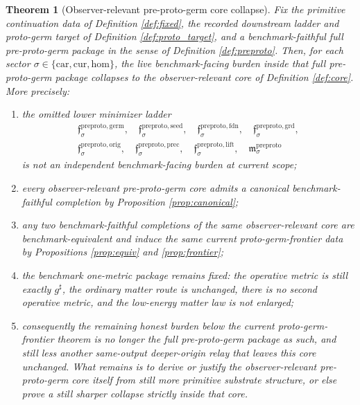 \documentclass[11pt]{article}
\newcommand{\CompletedMetric}{g^{\sharp}}
\newcommand{\Car}{\mathrm{car}}
\newcommand{\Cur}{\mathrm{cur}}
\newcommand{\Hom}{\mathrm{hom}}
\newcommand{\PreProtoGermMin}[1]{\mathfrak f_{#1}^{\mathrm{preproto,germ}}}
\newcommand{\PreProtoSeedMin}[1]{\mathfrak f_{#1}^{\mathrm{preproto,seed}}}
\newcommand{\PreProtoFoundMin}[1]{\mathfrak f_{#1}^{\mathrm{preproto,fdn}}}
\newcommand{\PreProtoGroundMin}[1]{\mathfrak f_{#1}^{\mathrm{preproto,grd}}}
\newcommand{\PreProtoOrigMin}[1]{\mathfrak f_{#1}^{\mathrm{preproto,orig}}}
\newcommand{\PreProtoPrecMin}[1]{\mathfrak f_{#1}^{\mathrm{preproto,prec}}}
\newcommand{\PreProtoLiftMin}[1]{\mathfrak f_{#1}^{\mathrm{preproto,lift}}}
\newcommand{\PreProtoSubMin}[1]{\mathfrak m_{#1}^{\mathrm{preproto}}}
\newtheorem{theorem}{Theorem}
\begin{document}
\begin{theorem}[Observer-relevant pre-proto-germ core collapse]
\label{thm:main}
Fix the primitive continuation data of Definition \ref{def:fixed}, the recorded downstream ladder and proto-germ target of Definition \ref{def:proto_target}, and a benchmark-faithful full pre-proto-germ package in the sense of Definition \ref{def:preproto}. Then, for each sector \(\sigma\in\{\Car,\Cur,\Hom\}\), the live benchmark-facing burden inside that full pre-proto-germ package collapses to the observer-relevant core of Definition \ref{def:core}. More precisely:
\begin{enumerate}
    \item the omitted lower minimizer ladder
    \[
    \begin{aligned}
    \PreProtoGermMin{\sigma},\quad
    \PreProtoSeedMin{\sigma},\quad
    \PreProtoFoundMin{\sigma},\quad
    \PreProtoGroundMin{\sigma},\\
    \PreProtoOrigMin{\sigma},\quad
    \PreProtoPrecMin{\sigma},\quad
    \PreProtoLiftMin{\sigma},\quad
    \PreProtoSubMin{\sigma}
    \end{aligned}
    \]
    is not an independent benchmark-facing burden at current scope;
    \item every observer-relevant pre-proto-germ core admits a canonical benchmark-faithful completion by Proposition \ref{prop:canonical};
    \item any two benchmark-faithful completions of the same observer-relevant core are benchmark-equivalent and induce the same current proto-germ-frontier data by Propositions \ref{prop:equiv} and \ref{prop:frontier};
    \item the benchmark one-metric package remains fixed: the operative metric is still exactly \(\CompletedMetric\), the ordinary matter route is unchanged, there is no second operative metric, and the low-energy matter law is not enlarged;
    \item consequently the remaining honest burden below the current proto-germ-frontier theorem is no longer the full pre-proto-germ package as such, and still less another same-output deeper-origin relay that leaves this core unchanged. What remains is to derive or justify the observer-relevant pre-proto-germ core itself from still more primitive substrate structure, or else prove a still sharper collapse strictly inside that core.
\end{enumerate}
\end{theorem}
\end{document}
